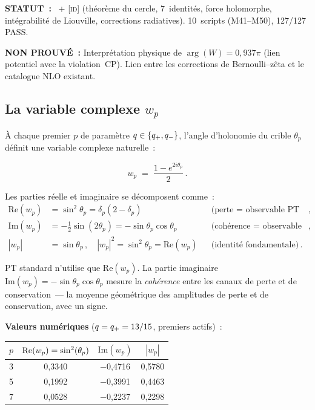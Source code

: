 \documentclass[12pt,a4paper]{article}
\begin{document}
\begin{statusbox}
\textbf{STATUT~:}
  \DERTAG\ + \textsc{[id]} (théorème du cercle, 7~identités, force
  holomorphe, intégrabilité de Liouville, corrections radiatives).
  10~scripts (M41--M50), 127/127 PASS.

\textbf{NON PROUVÉ~:}
  Interprétation physique de $\arg(W) = 0{,}937\pi$ (lien potentiel
  avec la violation~CP). Lien entre les corrections de
  Bernoulli--zêta et le catalogue NLO existant.
\end{statusbox}


\subsection{La variable complexe \texorpdfstring{$w_p$}{wp}}
\label{sec:cx_variable}

À chaque premier $p$ de paramètre $q \in \{q_{+}, q_{-}\}$,
l'angle d'holonomie du crible $\theta_p$ définit une variable
complexe naturelle~:

\begin{equation}
  w_p \;=\; \frac{1 - e^{2i\theta_p}}{2}\,.
  \label{eq:wp_def}
\end{equation}

Les parties réelle et imaginaire se décomposent comme~:
\begin{align}
  \mathrm{Re}(w_p) &= \sin^2\theta_p = \delta_p(2-\delta_p)
    && \text{(perte = observable PT standard)}\,, \label{eq:wp_re}\\
  \mathrm{Im}(w_p) &= -\tfrac{1}{2}\sin(2\theta_p) = -\sin\theta_p\cos\theta_p
    && \text{(cohérence = observable cachée)}\,, \label{eq:wp_im}\\
  |w_p| &= \sin\theta_p\,,\quad
  |w_p|^2 = \sin^2\theta_p = \mathrm{Re}(w_p)
    && \text{(identité fondamentale)}\,. \label{eq:wp_mod}
\end{align}

PT standard n'utilise que $\mathrm{Re}(w_p)$. La partie imaginaire
$\mathrm{Im}(w_p) = -\sin\theta_p\cos\theta_p$ mesure la
\emph{cohérence} entre les canaux de perte et de conservation~--- la
moyenne géométrique des amplitudes de perte et de conservation, avec
un signe.

\medskip
\noindent\textbf{Valeurs numériques} ($q = q_{+} = 13/15$, premiers
actifs)~:
\begin{center}
\begin{tabular}{cccc}
\toprule
$p$ & $\mathrm{Re}(w_p) = \sin^2(\theta_{p})$ & $\mathrm{Im}(w_p)$ & $|w_p|$ \\
\midrule
3 & 0{,}3340 & $-$0{,}4716 & 0{,}5780 \\
5 & 0{,}1992 & $-$0{,}3991 & 0{,}4463 \\
7 & 0{,}0528 & $-$0{,}2237 & 0{,}2298 \\
\bottomrule
\end{tabular}
\end{center}
\end{document}
